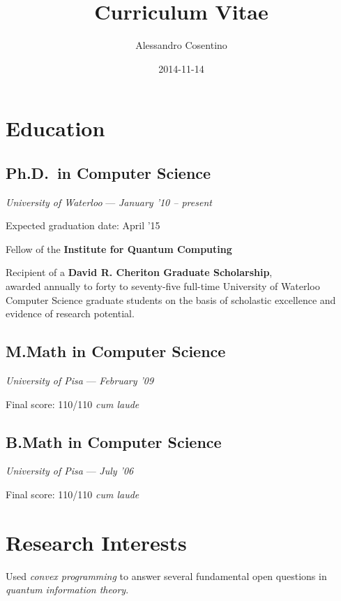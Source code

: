 \documentclass[]{article}
\title{Curriculum Vitae}
\author{Alessandro Cosentino}
\date{2014-11-14}
\begin{document}
\maketitle
\thispagestyle{empty}

\section{Education}\label{education}

\subsection{Ph.D.~in Computer Science}\label{ph.d.in-computer-science}

\emph{University of Waterloo} --- \emph{January '10 -- present}

Expected graduation date: April '15

Fellow of the \textbf{Institute for Quantum Computing}

Recipient of a \textbf{David R. Cheriton Graduate Scholarship},\\awarded
annually to forty to seventy-five full-time University of Waterloo
Computer Science graduate students on the basis of scholastic excellence
and evidence of research potential.

\subsection{M.Math in Computer
Science}\label{m.math-in-computer-science}

\emph{University of Pisa} --- \emph{February '09}

Final score: 110/110 \emph{cum laude}

\subsection{B.Math in Computer
Science}\label{b.math-in-computer-science}

\emph{University of Pisa} --- \emph{July '06}

Final score: 110/110 \emph{cum laude}

\section{Research Interests}

Used \emph{convex programming} to answer several fundamental open
questions in \emph{quantum information theory}.
\end{document}

